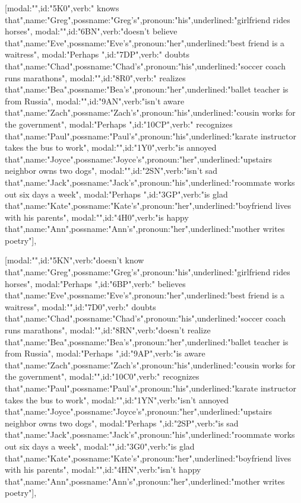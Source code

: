[{modal:"",id:"5K0",verb:" knows that",name:"Greg",possname:"Greg's",pronoun:"his",underlined:"girlfriend rides horses"},
{modal:"",id:"6BN",verb:"doesn't believe that",name:"Eve",possname:"Eve's",pronoun:"her",underlined:"best friend is a waitress"},
{modal:"Perhaps ",id:"7DP",verb:" doubts that",name:"Chad",possname:"Chad's",pronoun:"his",underlined:"soccer coach runs marathons"},
{modal:"",id:"8R0",verb:" realizes that",name:"Bea",possname:"Bea's",pronoun:"her",underlined:"ballet teacher is from Russia"},
{modal:"",id:"9AN",verb:"isn't aware that",name:"Zach",possname:"Zach's",pronoun:"his",underlined:"cousin works for the government"},
{modal:"Perhaps ",id:"10CP",verb:" recognizes that",name:"Paul",possname:"Paul's",pronoun:"his",underlined:"karate instructor takes the bus to work"},
{modal:"",id:"1Y0",verb:"is annoyed that",name:"Joyce",possname:"Joyce's",pronoun:"her",underlined:"upstairs neighbor owns two dogs"},
{modal:"",id:"2SN",verb:"isn't sad that",name:"Jack",possname:"Jack's",pronoun:"his",underlined:"roommate works out six days a week"},
{modal:"Perhaps ",id:"3GP",verb:"is glad that",name:"Kate",possname:"Kate's",pronoun:"her",underlined:"boyfriend lives with his parents"},
{modal:"",id:"4H0",verb:"is happy that",name:"Ann",possname:"Ann's",pronoun:"her",underlined:"mother writes poetry"}],

[{modal:"",id:"5KN",verb:"doesn't know that",name:"Greg",possname:"Greg's",pronoun:"his",underlined:"girlfriend rides horses"},
{modal:"Perhaps ",id:"6BP",verb:" believes that",name:"Eve",possname:"Eve's",pronoun:"her",underlined:"best friend is a waitress"},
{modal:"",id:"7D0",verb:" doubts that",name:"Chad",possname:"Chad's",pronoun:"his",underlined:"soccer coach runs marathons"},
{modal:"",id:"8RN",verb:"doesn't realize that",name:"Bea",possname:"Bea's",pronoun:"her",underlined:"ballet teacher is from Russia"},
{modal:"Perhaps ",id:"9AP",verb:"is aware that",name:"Zach",possname:"Zach's",pronoun:"his",underlined:"cousin works for the government"},
{modal:"",id:"10C0",verb:" recognizes that",name:"Paul",possname:"Paul's",pronoun:"his",underlined:"karate instructor takes the bus to work"},
{modal:"",id:"1YN",verb:"isn't annoyed that",name:"Joyce",possname:"Joyce's",pronoun:"her",underlined:"upstairs neighbor owns two dogs"},
{modal:"Perhaps ",id:"2SP",verb:"is sad that",name:"Jack",possname:"Jack's",pronoun:"his",underlined:"roommate works out six days a week"},
{modal:"",id:"3G0",verb:"is glad that",name:"Kate",possname:"Kate's",pronoun:"her",underlined:"boyfriend lives with his parents"},
{modal:"",id:"4HN",verb:"isn't happy that",name:"Ann",possname:"Ann's",pronoun:"her",underlined:"mother writes poetry"}],

